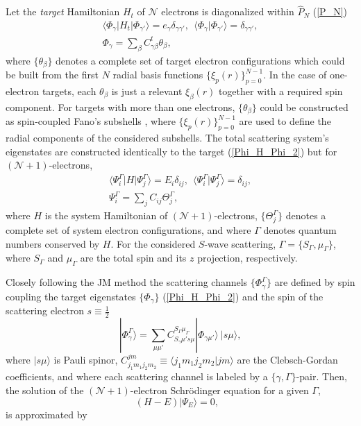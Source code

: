 \documentclass[aip
, pra
, showpacs
, aps
, twocolumn
, groupedaddress
, floatfix
]{revtex4}
\newcommand{\beq}{\begin{equation}}
\newcommand{\eeq}{\end{equation}}
\newcommand{\barr}{\begin{array}}
\newcommand{\earr}{\end{array}}
\begin{document}
Let the {\em target} Hamiltonian $H_t$ of
$\mathcal{N}$ electrons
is diagonalized within $\hat{P}_N$ (\ref{P_N})
\beq \barr{l}
\langle \Phi_\gamma|H_t|\Phi_{\gamma'}\rangle=e_\gamma \delta_{\gamma\gamma'}, \ \
\langle \Phi_\gamma|\Phi_{\gamma'}\rangle=\delta_{\gamma\gamma'},\\
\Phi_\gamma = \sum_{\beta} C^t_{\gamma \beta} \theta_\beta,
\earr \label{Phi_H_Phi_2} \eeq
where $\{\theta_\beta\}$ denotes a complete set of target electron configurations which could be built from
the first $N$ radial basis functions $\{\xi_p(r)\}_{p=0}^{N-1}$.
In the case of one-electron targets, each
$\theta_\beta$ is just a relevant $\xi_\beta(r)$ together with a required spin component.
For targets with more than one electrons, $\{\theta_\beta\}$ could be constructed as spin-coupled Fano's subshells \cite{Fano65,KFB11},
where $\{\xi_p(r)\}_{p=0}^{N-1}$ are used to define the radial components of the considered subshells.
The total scattering system's eigenstates are constructed identically to the target (\ref{Phi_H_Phi_2})
but for $(\mathcal{N}+1)$-electrons,
\beq \barr{l}
\langle\Psi_i^\Gamma|H|\Psi_j^\Gamma\rangle=E_i\delta_{ij}, \ \
 \langle\Psi_i^\Gamma|\Psi_j^\Gamma\rangle=\delta_{ij},\\
\Psi^\Gamma_i = \sum_{j} C_{ij} \Theta^\Gamma_j,
\earr \label{Psi_H_Psi_2} \eeq
where $H$ is the system Hamiltonian of $(\mathcal{N}+1)$-electrons, $\{\Theta_j^\Gamma\}$
denotes a complete set of system electron configurations, and where
$\Gamma$ denotes quantum numbers conserved by $H$.
For the considered $S$-wave scattering,
$\Gamma=\{S_\Gamma,\mu_\Gamma\}$, where $S_\Gamma$ and $\mu_\Gamma$ are the total spin and its $z$ projection, respectively.


Closely following the JM method \cite{BR76p1491, KFB11} the scattering channels $\{\Phi_\gamma^\Gamma\}$ are defined by spin coupling the target eigenstates
$\{\Phi_\gamma\}$ (\ref{Phi_H_Phi_2})
and the spin of the scattering electron
$s\equiv \frac{1}{2}$
\beq
| \Phi_{\gamma}^{\Gamma} \rangle = \sum_{\mu \mu'}
C_{S_\gamma \mu' s \mu}^{S_\Gamma \mu_\Gamma}
|\Phi_{\gamma \mu'} \rangle \ |s \mu  \rangle,
\label{chi_phi_Gamma} \eeq
where $|s \mu \rangle$ is Pauli spinor,
$C_{j_1m_1j_2m_2}^{jm} \equiv \langle j_1m_1 j_2 m_2| jm\rangle$ are the Clebsch-Gordan coefficients,
and where each scattering channel is labeled by a $\{\gamma, \Gamma\}$-pair.
Then, the solution of the $(\mathcal{N}+1)$-electron Schr\"odinger equation for a given $\Gamma$,
\beq
(H-E) | \Psi_E \rangle =0,  \ \ \  \label{H_E_Psi_E_2}
\eeq
is approximated by
\end{document}
